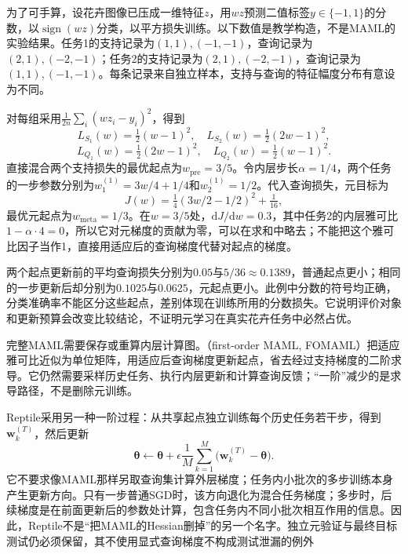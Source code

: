 \begin{example}[同一组分类任务中的起点与适应后损失]
  \label{ex:ket-transfer-maml-numeric}
  为了可手算，设花卉图像已压成一维特征$z$，用$wz$预测二值标签$y\in\{-1,1\}$的分数，以$\operatorname{sign}(wz)$分类，以平方损失训练。以下数值是教学构造，不是MAML的实验结果。任务1的支持记录为$(1,1),(-1,-1)$，查询记录为$(2,1),(-2,-1)$；任务2的支持记录为$(2,1),(-2,-1)$，查询记录为$(1,1),(-1,-1)$。每条记录来自独立样本，支持与查询的特征幅度分布有意设为不同。

  对每组采用$\frac{1}{2n}\sum_i(wz_i-y_i)^2$，得到
  \[
    L_{S_1}(w)=\tfrac12(w-1)^2,\quad
    L_{S_2}(w)=\tfrac12(2w-1)^2,
  \]
  \[
    L_{Q_1}(w)=\tfrac12(2w-1)^2,\quad
    L_{Q_2}(w)=\tfrac12(w-1)^2.
  \]
  直接混合两个支持损失的最优起点为$w_{\mathrm{pre}}=3/5$。令内层步长$\alpha=1/4$，两个任务的一步参数分别为$w_1^{(1)}=3w/4+1/4$和$w_2^{(1)}=1/2$。代入查询损失，元目标为
  \[
    J(w)=\tfrac14(3w/2-1/2)^2+\tfrac1{16},
  \]
  最优元起点为$w_{\mathrm{meta}}=1/3$。在$w=3/5$处，$\mathrm dJ/\mathrm dw=0.3$，其中任务2的内层雅可比$1-\alpha\cdot4=0$，所以它对元梯度的贡献为零，可以在求和中略去；不能把这个雅可比因子当作1，直接用适应后的查询梯度代替对起点的梯度。

  两个起点更新前的平均查询损失分别为$0.05$与$5/36\approx0.1389$，普通起点更小；相同的一步更新后却分别为$0.1025$与$0.0625$，元起点更小。此例中分数的符号均正确，分类准确率不能区分这些起点，差别体现在训练所用的分数损失。它说明评价对象和更新预算会改变比较结论，不证明元学习在真实花卉任务中必然占优。
\end{example}

完整MAML需要保存或重算内层计算图。（first-order MAML, FOMAML）把适应雅可比近似为单位矩阵，用适应后查询梯度更新起点，省去经过支持梯度的二阶求导。它仍然需要采样历史任务、执行内层更新和计算查询反馈；“一阶”减少的是求导路径，不是删除元训练。

Reptile采用另一种一阶过程：从共享起点独立训练每个历史任务若干步，得到$\bm w_k^{(T)}$，然后更新
\begin{equation}
  \bm{\theta}\leftarrow\bm{\theta}
   +\epsilon\frac1M\sum_{k=1}^{M}
        \bigl(\bm w_k^{(T)}-\bm{\theta}\bigr).
  \label{eq:ket-transfer-reptile}
\end{equation}
它不要求像MAML那样另取查询集计算外层梯度；任务内小批次的多步训练本身产生更新方向。只有一步普通SGD时，该方向退化为混合任务梯度；多步时，后续梯度是在前面更新后的参数处计算，包含任务内不同小批次相互作用的信息。因此，Reptile不是“把MAML的Hessian删掉”的另一个名字。独立元验证与最终目标测试仍必须保留，其不使用显式查询梯度不构成测试泄漏的例外


